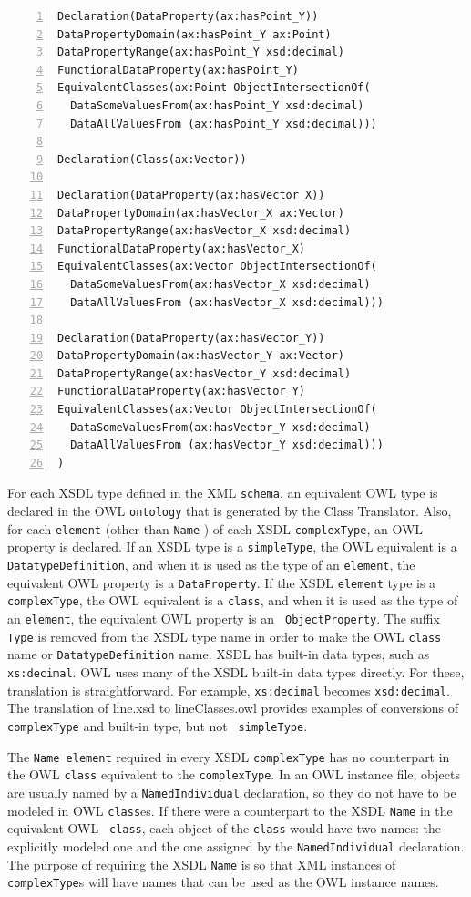 \documentclass[preprint,12pt]{elsarticle}
\newenvironment{mylisting}
{\begin{list}{}{\setlength{\leftmargin}{1em}}\item\small}
{\end{list}}
\begin{document}
\begin{mylisting}
\begin{Verbatim}[commandchars=\\\{\},numbers=left, numbersep=1pt]
Declaration(DataProperty(ax:hasPoint_Y))
DataPropertyDomain(ax:hasPoint_Y ax:Point)
DataPropertyRange(ax:hasPoint_Y xsd:decimal)
FunctionalDataProperty(ax:hasPoint_Y)
EquivalentClasses(ax:Point ObjectIntersectionOf(
  DataSomeValuesFrom(ax:hasPoint_Y xsd:decimal)
  DataAllValuesFrom (ax:hasPoint_Y xsd:decimal)))

Declaration(Class(ax:Vector))

Declaration(DataProperty(ax:hasVector_X))
DataPropertyDomain(ax:hasVector_X ax:Vector)
DataPropertyRange(ax:hasVector_X xsd:decimal)
FunctionalDataProperty(ax:hasVector_X)
EquivalentClasses(ax:Vector ObjectIntersectionOf(
  DataSomeValuesFrom(ax:hasVector_X xsd:decimal)
  DataAllValuesFrom (ax:hasVector_X xsd:decimal)))

Declaration(DataProperty(ax:hasVector_Y))
DataPropertyDomain(ax:hasVector_Y ax:Vector)
DataPropertyRange(ax:hasVector_Y xsd:decimal)
FunctionalDataProperty(ax:hasVector_Y)
EquivalentClasses(ax:Vector ObjectIntersectionOf(
  DataSomeValuesFrom(ax:hasVector_Y xsd:decimal)
  DataAllValuesFrom (ax:hasVector_Y xsd:decimal)))
)
\end{Verbatim}
\label{owlClasses}
\end{mylisting}

For each XSDL type defined in the XML {\tt schema}, an equivalent OWL type
is declared in the OWL {\tt ontology} that is generated by the Class
Translator. Also, for each {\tt element} (other than {\tt Name} ) of each
XSDL {\tt complexType}, an OWL property is declared. If an XSDL type is a
{\tt simpleType}, the OWL equivalent is a {\tt DatatypeDefinition}, and
when it is used as the type of an {\tt element}, the equivalent OWL
property is a {\tt DataProperty}. If the XSDL {\tt element} type is a {\tt
  complexType}, the OWL equivalent is a {\tt class}, and when it is used as
the type of an {\tt element}, the equivalent OWL property is an {\tt
  ObjectProperty}. The suffix {\tt Type} is removed from the XSDL type
name in order to make the OWL {\tt class} name or {\tt DatatypeDefinition}
name. XSDL has built-in data types, such as {\tt xs:decimal}. OWL uses
many of the XSDL built-in data types directly. For these, translation is
straightforward. For example, {\tt xs:decimal} becomes {\tt xsd:decimal}.
The translation of line.xsd to lineClasses.owl provides examples of
conversions of {\tt complexType} and built-in type, but not {\tt
  simpleType}.

The {\tt Name element} required in every XSDL {\tt complexType} has no
counterpart in the OWL {\tt class} equivalent to the {\tt complexType}. In
an OWL instance file, objects are usually named by a {\tt NamedIndividual}
declaration, so they do not have to be modeled in OWL {\tt class}es. If
there were a counterpart to the XSDL {\tt Name} in the equivalent OWL {\tt
  class}, each object of the {\tt class} would have two names: the
explicitly modeled one and the one assigned by the {\tt NamedIndividual}
declaration. The purpose of requiring the XSDL {\tt Name} is so that XML
instances of {\tt complexType}s will have names that can be used as the OWL
instance names.
\end{document}
